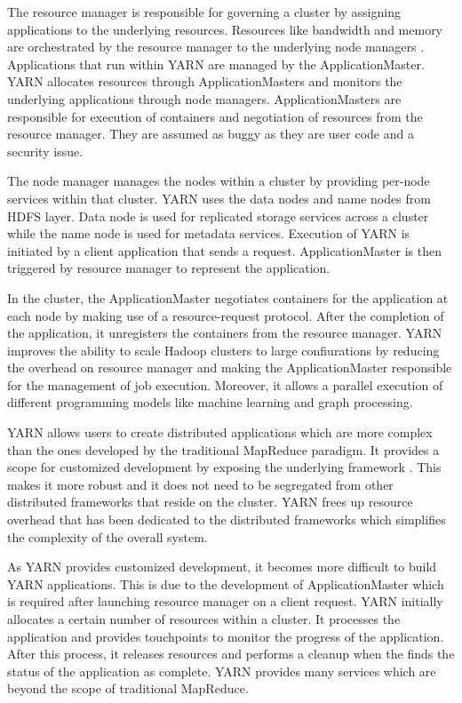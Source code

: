 \documentclass[9pt,twocolumn,twoside]{../../styles/osajnl}
\begin{document}
The resource manager is responsible for governing a cluster by
assigning applications to the underlying resources. Resources like
bandwidth and memory are orchestrated by the resource manager to the
underlying node managers \cite{yarnIbm}. Applications that run within
YARN are managed by the ApplicationMaster. YARN allocates resources
through ApplicationMasters and monitors the underlying applications
through node managers. ApplicationMasters are responsible for
execution of containers and negotiation of resources from the resource
manager. They are assumed as buggy as they are user code and a
security issue.

The node manager manages the nodes within a cluster by providing
per-node services within that cluster. YARN uses the data nodes and
name nodes from HDFS layer. Data node is used for replicated storage
services across a cluster while the name node is used for metadata
services. Execution of YARN is initiated by a client application that
sends a request. ApplicationMaster is then triggered by resource
manager to represent the application.

In the cluster, the ApplicationMaster negotiates containers for the
application at each node by making use of a resource-request
protocol. After the completion of the application, it unregisters the
containers from the resource manager. YARN improves the ability to
scale Hadoop clusters to large confiurations by reducing the overhead
on resource manager and making the ApplicationMaster responsible for
the management of job execution. Moreover, it allows a parallel
execution of different programming models like machine learning and
graph processing.

YARN allows users to create distributed applications which are more
complex than the ones developed by the traditional MapReduce
paradigm. It provides a scope for customized development by exposing
the underlying framework \cite{yarnIbm}. This makes it more robust and
it does not need to be segregated from other distributed frameworks
that reside on the cluster. YARN frees up resource overhead that has
been dedicated to the distributed frameworks which simplifies the
complexity of the overall system.

As YARN provides customized development, it becomes more difficult to
build YARN applications. This is due to the development of
ApplicationMaster which is required after launching resource manager
on a client request. YARN initially allocates a certain number of
resources within a cluster. It processes the application and provides
touchpoints to monitor the progress of the application. After this
process, it releases resources and performs a cleanup when the finds
the status of the application as complete. YARN provides many services
which are beyond the scope of traditional MapReduce. 
\end{document}

